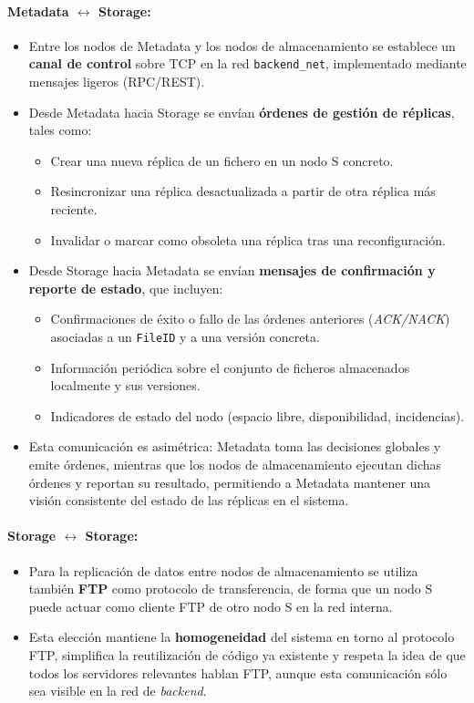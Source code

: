 \documentclass{article}
\begin{document}
\paragraph{Metadata $\leftrightarrow$ Storage:}
\begin{itemize}
    \item Entre los nodos de Metadata y los nodos de almacenamiento se establece un \textbf{canal de control} sobre TCP en la red \texttt{backend\_net}, implementado mediante mensajes ligeros (RPC/REST).
    \item Desde Metadata hacia Storage se envían \textbf{órdenes de gestión de réplicas}, tales como:
    \begin{itemize}
        \item Crear una nueva réplica de un fichero en un nodo S concreto.
        \item Re\-sincronizar una réplica desactualizada a partir de otra réplica más reciente.
        \item Invalidar o marcar como obsoleta una réplica tras una reconfiguración.
    \end{itemize}
    \item Desde Storage hacia Metadata se envían \textbf{mensajes de confirmación y reporte de estado}, que incluyen:
    \begin{itemize}
        \item Confirmaciones de éxito o fallo de las órdenes anteriores (\emph{ACK/NACK}) asociadas a un \texttt{FileID} y a una versión concreta.
        \item Información periódica sobre el conjunto de ficheros almacenados localmente y sus versiones.
        \item Indicadores de estado del nodo (espacio libre, disponibilidad, incidencias).
    \end{itemize}
    \item Esta comunicación es asimétrica: Metadata toma las decisiones globales y emite órdenes, mientras que los nodos de almacenamiento ejecutan dichas órdenes y reportan su resultado, permitiendo a Metadata mantener una visión consistente del estado de las réplicas en el sistema.
\end{itemize}

\paragraph{Storage $\leftrightarrow$ Storage:}
\begin{itemize}
    \item Para la replicación de datos entre nodos de almacenamiento se utiliza también \textbf{FTP} como protocolo de transferencia, de forma que un nodo S puede actuar como cliente FTP de otro nodo S en la red interna.
    \item Esta elección mantiene la \textbf{homogeneidad} del sistema en torno al protocolo FTP, simplifica la reutilización de código ya existente y respeta la idea de que todos los servidores relevantes hablan FTP, aunque esta comunicación sólo sea visible en la red de \emph{backend}.
\end{itemize}
\end{document}
